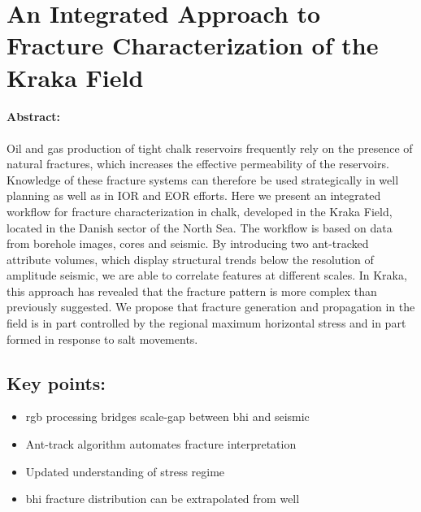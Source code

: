 \section{An Integrated Approach to Fracture Characterization of the Kraka Field}
\label{sec:tala}

\paragraph{Abstract:} Oil and gas production of tight chalk reservoirs frequently rely on the presence of natural fractures, which increases the effective permeability of the reservoirs.  Knowledge of these fracture systems can therefore be used strategically in well planning as well as in IOR and EOR efforts.  Here we present an integrated workflow for fracture characterization in chalk, developed in the Kraka Field, located in the Danish sector of the North Sea.  The workflow is based on data from borehole images, cores and seismic.  By introducing two ant-tracked attribute volumes, which display structural trends below the resolution of amplitude seismic, we are able to correlate features at different scales.  In Kraka, this approach has revealed that the fracture pattern is more complex than previously suggested.  We propose that fracture generation and propagation in the field is in part controlled by the regional maximum horizontal stress and in part formed in response to salt movements.
\vfill
\subsection*{Key points:}
\begin{itemize}
    \item \acf{rgb} processing bridges scale-gap between \acf{bhi} and seismic
    \item Ant-track algorithm automates fracture interpretation
    \item Updated understanding of stress regime
    \item \ac{bhi} fracture distribution can be extrapolated from well 
\end{itemize}
\vfill
{\vfill\hfill\newline{}}


